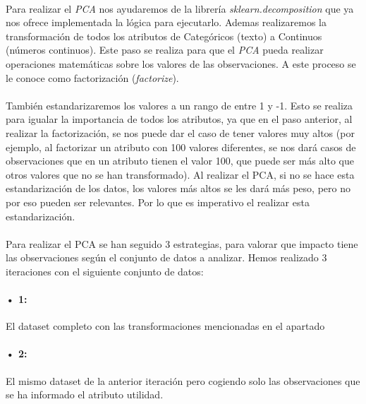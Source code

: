 \paragraph{}
Para realizar el \textit{PCA} nos ayudaremos de la librería \textit{sklearn.decomposition} que ya nos ofrece implementada la lógica para ejecutarlo. Ademas realizaremos la transformación de todos los atributos de Categóricos (texto) a Continuos (números continuos). Este paso se realiza para que el \textit{PCA} pueda realizar operaciones matemáticas sobre los valores de las observaciones. A este proceso se le conoce como factorización (\textit{factorize}). 

\paragraph{}
También estandarizaremos los valores a un rango de entre 1 y -1. Esto se realiza para igualar la importancia de todos los atributos, ya que en el paso anterior, al realizar la factorización, se nos puede dar el caso de tener valores muy altos (por ejemplo, al factorizar un atributo con 100 valores diferentes, se nos dará casos de observaciones que en un atributo tienen el valor 100, que puede ser más alto que otros valores que no se han transformado). Al realizar el PCA, si no se hace esta estandarización de los datos, los valores más altos se les dará más peso, pero no por eso pueden ser relevantes. Por lo que es imperativo el realizar esta estandarización.

\paragraph{}
Para realizar el PCA se han seguido 3 estrategias, para valorar que impacto tiene las observaciones según el conjunto de datos a analizar. Hemos realizado 3 iteraciones con el siguiente conjunto de datos:

\paragraph{• 1: } El dataset completo con las transformaciones mencionadas en el apartado 

\paragraph{• 2: } El mismo dataset de la anterior iteración pero cogiendo solo las observaciones que se ha informado el atributo utilidad.


